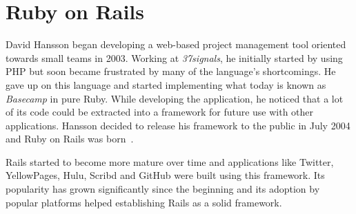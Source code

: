 \section{Ruby on Rails} %
\label{tech:sec:ruby_on_rails}
David Hansson began developing a web-based project management tool oriented towards small teams in 2003. Working at \textit{37signals}, he initially started by using PHP but soon became frustrated by many of the language's shortcomings. He gave up on this language and started implementing what today is known as \textit{Basecamp} in pure Ruby. While developing the application, he noticed that a lot of its code could be extracted into a framework for future use with other applications. Hansson decided to release his framework to the public in July 2004 and Ruby on Rails was born~\cite{railssolutions}.

Rails started to become more mature over time and applications like Twitter, YellowPages, Hulu, Scribd and GitHub were built using this framework. Its popularity has grown significantly since the beginning and its adoption by popular platforms helped establishing Rails as a solid framework.

